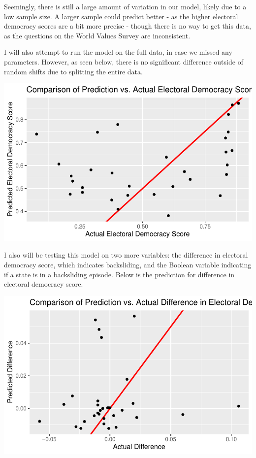 \documentclass[
  letterpaper,
  DIV=11,
  numbers=noendperiod]{scrartcl}
\begin{document}
Seemingly, there is still a large amount of variation in our model,
likely due to a low sample size. A larger sample could predict better -
as the higher electoral democracy scores are a bit more precise - though
there is no way to get this data, as the questions on the World Values
Survey are inconsistent.

I will also attempt to run the model on the full data, in case we missed
any parameters. However, as seen below, there is no significant
difference outside of random shifts due to splitting the entire data.

\includegraphics{Episode_2_files/figure-pdf/fulldata-1.pdf}

I also will be testing this model on two more variables: the difference
in electoral democracy score, which indicates backsliding, and the
Boolean variable indicating if a state is in a backsliding episode.
Below is the prediction for difference in electoral democracy score.

\includegraphics{Episode_2_files/figure-pdf/diffpolyarchy-1.pdf}
\end{document}
